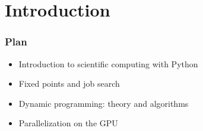 


\subtitle{Introduction}

\author{John Stachurski}


\date{September 2022}




\begin{frame}
  \titlepage
\end{frame}





\section{Introduction}



\begin{frame}
    \frametitle{Plan}


    \begin{itemize}
        \item Introduction to scientific computing with Python
        \vspace{0.5em}
        \vspace{0.5em}
        \item Fixed points and job search 
        \vspace{0.5em}
        \vspace{0.5em}
        \item Dynamic programming: theory and algorithms
        \vspace{0.5em}
        \vspace{0.5em}
        \item Parallelization on the GPU 
    \end{itemize}

\end{frame}




